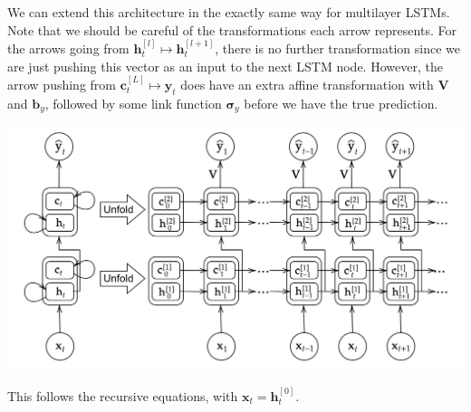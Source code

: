 \documentclass{article}
\begin{document}
      We can extend this architecture in the exactly same way for multilayer LSTMs. Note that we should be careful of the transformations each arrow represents. For the arrows going from $\mathbf{h}_{t}^{[l]} \mapsto \mathbf{h}_{t}^{[l+1]}$, there is no further transformation since we are just pushing this vector as an input to the next LSTM node. However, the arrow pushing from $\mathbf{c}_t^{[L]} \mapsto \hat{\mathbf{y}}_{t}$ does have an extra affine transformation with $\mathbf{V}$ and $\mathbf{b}_y$, followed by some link function $\boldsymbol{\sigma}_y$ before we have the true prediction.  
      \begin{center}
          \includegraphics[scale=0.3]{img/04_RNN/multilayer_LSTM.png}
      \end{center}
      This follows the recursive equations, with $\mathbf{x}_t = \mathbf{h}^{[0]}_{t}$. 
\end{document}
